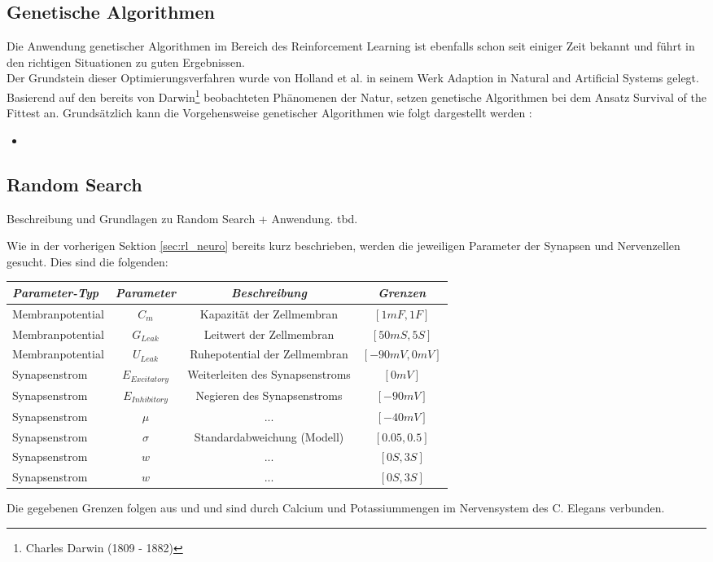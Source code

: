 	\subsection{Genetische Algorithmen}
		Die Anwendung genetischer Algorithmen im Bereich des Reinforcement Learning ist ebenfalls schon seit einiger Zeit bekannt und führt in den richtigen Situationen zu guten Ergebnissen.\\
		Der Grundstein dieser Optimierungsverfahren wurde von Holland et al. in seinem Werk \grqq Adaption in Natural and Artificial Systems \glqq{} \cite{Holland1992} gelegt. Basierend auf den bereits von Darwin\footnote{Charles Darwin (1809 - 1882)} beobachteten Phänomenen der Natur, setzen genetische Algorithmen bei dem Ansatz \glqq Survival of the Fittest\grqq{} an. Grundsätzlich kann die Vorgehensweise genetischer Algorithmen wie folgt dargestellt werden \cite{Goldberg1989}:
		\begin{itemize}
			\item 
		\end{itemize}
	\subsection{Random Search}
		Beschreibung und Grundlagen zu Random Search + Anwendung. tbd.
		
	
	Wie in der vorherigen Sektion \ref{sec:rl_neuro} bereits kurz beschrieben, werden die jeweiligen Parameter der Synapsen und Nervenzellen gesucht. Dies sind die folgenden:
	\begin{center}
		\begin{tabular}{l@{\hskip 0.5cm}c@{\hskip 0.5cm}c@{\hskip 0.5cm}c}    \toprule
			\setlength{\tabcolsep}{50pt}
			\renewcommand{\arraystretch}{1.5}
			\emph{Parameter-Typ} 	& \emph{Parameter}  & \emph{Beschreibung} 				& \emph{Grenzen} 					 \\\midrule
			Membranpotential		& $C_m$				& Kapazität der Zellmembran			& $[1mF, 1F]$						 \\ 
			Membranpotential	 	& $G_{Leak}$		& Leitwert der Zellmembran			& $[50mS, 5S]$						 \\
			Membranpotential	 	& $U_{Leak}$		& Ruhepotential der Zellmembran		& $[-90mV, 0mV]$						 \\
			Synapsenstrom			& $E_{Excitatory}$	& Weiterleiten des Synapsenstroms	& $[0mV]$							 \\
			Synapsenstrom			& $E_{Inhibitory}$	& Negieren des Synapsenstroms		& $[-90mV]$							 \\ 
			Synapsenstrom			& $\mu$				& ...								& $[-40mV]$							 \\
			Synapsenstrom			& $\sigma$			& Standardabweichung (Modell)		& $[0.05, 0.5]$						 \\ 
			Synapsenstrom		 	& $w$				& ...								& $[0S, 3S]$							 \\
			Synapsenstrom				& $\hat{w}$			& ...								& $[0S, 3S]$							 \\\bottomrule
			\hline
		\end{tabular}
	\end{center}
	Die gegebenen Grenzen folgen aus \cite{WormLevelRL} und \cite{SimCE} und sind durch Calcium und Potassiummengen im Nervensystem des C. Elegans verbunden.

